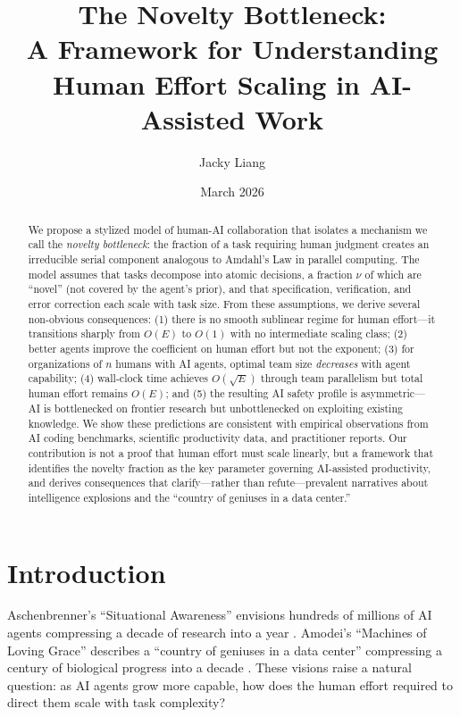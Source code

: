 \documentclass[11pt,a4paper]{article}
\title{\textbf{The Novelty Bottleneck:} \\ A Framework for Understanding Human Effort Scaling in AI-Assisted Work}
\author{Jacky Liang}
\date{March 2026}
\begin{document}
\maketitle

\begin{abstract}
We propose a stylized model of human-AI collaboration that isolates a mechanism we call the \emph{novelty bottleneck}: the fraction of a task requiring human judgment creates an irreducible serial component analogous to Amdahl's Law in parallel computing. The model assumes that tasks decompose into atomic decisions, a fraction $\nu$ of which are ``novel'' (not covered by the agent's prior), and that specification, verification, and error correction each scale with task size. From these assumptions, we derive several non-obvious consequences: (1) there is no smooth sublinear regime for human effort---it transitions sharply from $O(E)$ to $O(1)$ with no intermediate scaling class; (2) better agents improve the coefficient on human effort but not the exponent; (3) for organizations of $n$ humans with AI agents, optimal team size \emph{decreases} with agent capability; (4) wall-clock time achieves $O(\sqrt{E})$ through team parallelism but total human effort remains $O(E)$; and (5) the resulting AI safety profile is asymmetric---AI is bottlenecked on frontier research but unbottlenecked on exploiting existing knowledge. We show these predictions are consistent with empirical observations from AI coding benchmarks, scientific productivity data, and practitioner reports. Our contribution is not a proof that human effort must scale linearly, but a framework that identifies the novelty fraction as the key parameter governing AI-assisted productivity, and derives consequences that clarify---rather than refute---prevalent narratives about intelligence explosions and the ``country of geniuses in a data center.''
\end{abstract}

\section{Introduction}

Aschenbrenner's ``Situational Awareness'' envisions hundreds of millions of AI agents compressing a decade of research into a year \citep{aschenbrenner2024}. Amodei's ``Machines of Loving Grace'' describes a ``country of geniuses in a data center'' compressing a century of biological progress into a decade \citep{amodei2024}. These visions raise a natural question: as AI agents grow more capable, how does the human effort required to direct them scale with task complexity?
\end{document}
